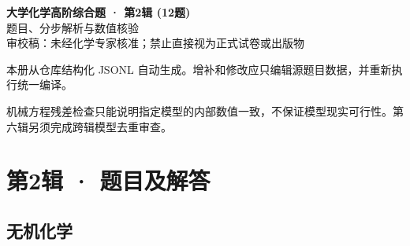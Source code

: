 \documentclass[UTF8,11pt,a4paper]{ctexart}
\begin{document}
\begin{center}
{\LARGE\bfseries 大学化学高阶综合题 · 第2辑 (12题)}\\[0.8em]
{\large 题目、分步解析与数值核验}\\[0.5em]
{\small \textcolor{red!65!black}{审校稿：未经化学专家核准；禁止直接视为正式试卷或出版物}}
\end{center}
\vspace{1em}
\noindent 本册从仓库结构化 JSONL 自动生成。增补和修改应只编辑源题目数据，并重新执行统一编译。
\par 机械方程残差检查只能说明指定模型的内部数值一致，不保证模型现实可行性。第六辑另须完成跨辑模型去重审查。
\tableofcontents
\clearpage
\section*{第2辑 · 题目及解答}
\subsection*{无机化学}
\end{document}

